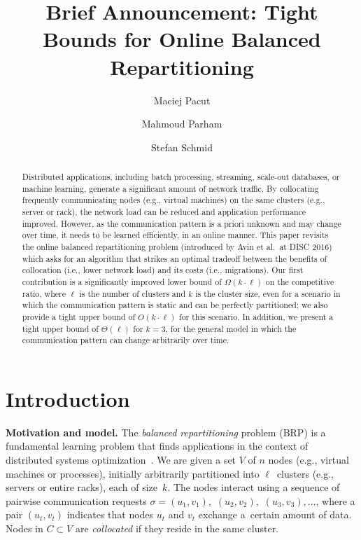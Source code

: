 \documentclass[manuscript,screen=true, review, anonymous]{acmart}
\title{Brief Announcement: Tight Bounds for Online Balanced Repartitioning}
\author{Maciej Pacut}
\affiliation{%
  \institution{Faculty of Computer Science, University of Vienna}
  \country{Austria}
}
\author{Mahmoud Parham}
\affiliation{%
  \institution{Faculty of Computer Science, University of Vienna}
  \country{Austria}
}
\author{Stefan Schmid}
\affiliation{%
  \institution{Faculty of Computer Science, University of Vienna}
  \country{Austria}
}
\newcommand{\OBRP}{BRP}
\begin{document}
\begin{abstract}
Distributed   applications,  including  batch  processing, streaming, scale-out databases,
or machine learning, generate a significant amount of network traffic. By collocating frequently communicating nodes (e.g., virtual machines) on the same clusters (e.g., server or rack), the network load can be reduced and application performance improved. 
However, as the communication pattern is a priori unknown and may change over time, it needs to be learned efficiently, in an online manner.
%
This paper revisits the online 
balanced repartitioning problem 
(introduced by Avin et al.~at DISC 2016)
which asks for an algorithm that strikes
an optimal tradeoff between the benefits
of collocation (i.e., lower network load) 
and its costs (i.e., migrations). 
%
Our first contribution is a significantly improved
lower bound of $\Omega(k\cdot \ell)$ on the
competitive ratio, where $\ell$ is the number
of clusters and $k$ is the cluster size,
even for a scenario in which the communication
pattern is static and can be perfectly partitioned;
we also provide a tight upper bound 
of $O(k\cdot \ell)$ for this scenario.
In addition, we present a tight upper bound
of $\Theta(\ell)$ for $k=3$,
for the general model in which the
communication pattern can change arbitrarily
over time. 
\end{abstract}
    
\maketitle
    
\renewcommand{\shortauthors}{M.~Pacut, M.~Parham, S.~Schmid}

\section{Introduction}

\noindent \textbf{Motivation and model.}
The \emph{balanced repartitioning} problem (\OBRP{})
is a fundamental learning problem
that finds applications in the context of
distributed systems optimization~\cite{repartition-disc}. We are given a set $V$ of $n$ nodes 
(e.g., virtual machines or processes),
initially arbitrarily partitioned into $\ell$~clusters
(e.g., servers or entire racks),
each of size~$k$.
The nodes interact using
a sequence of pairwise communication requests
$\sigma = (u_1,v_1),$ $(u_2,v_2),$ $(u_3,v_3), \ldots$,
where a pair $(u_t,v_t)$ indicates that nodes $u_t$ and $v_t$ exchange a~certain amount of data.
Nodes in $C \subset V$ are \emph{collocated}
if they reside in the same cluster.
\end{document}
